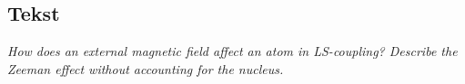 \subsection{Tekst}

\emph{How does an external magnetic field affect an atom in LS-coupling? Describe the Zeeman effect without accounting for the nucleus.}
